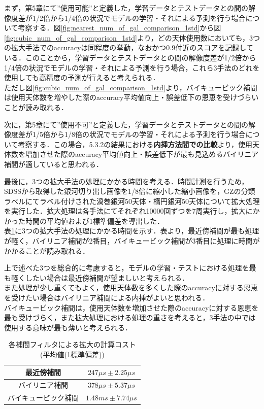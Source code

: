 \documentclass[a4j, 11pt]{jreport}
\begin{document}
まず，第5章にて''使用可能''と定義した，学習データとテストデータとの間の解像度差が1/2倍から1/4倍の状況でモデルの学習・それによる予測を行う場合について考察する．図\ref{fig:nearest_num_of_gal_comparison_1std}から図\ref{fig:cubic_num_of_gal_comparison_1std}より，どの天体使用数においても，3つの拡大手法でのaccuracyは同程度の挙動，なおかつ0.9付近のスコアを記録している．このことから，学習データとテストデータとの間の解像度差が1/2倍から1/4倍の状況でモデルの学習・それによる予測を行う場合，これら3手法のどれを使用しても高精度の予測が行えると考えられる．
\\ただし図\ref{fig:cubic_num_of_gal_comparison_1std}より，バイキュービック補間は使用天体数を増やした際のaccuracy平均値向上・誤差低下の恩恵を受けづらいことが読み取れる．

次に，第5章にて''使用不可''と定義した，学習データとテストデータとの間の解像度差が1/5倍から1/8倍の状況でモデルの学習・それによる予測を行う場合について考察する．この場合，5.3.2の結果における\textbf{内挿方法間での比較}より，使用天体数を増加させた際のaccuracy平均値向上・誤差低下が最も見込めるバイリニア補間が適していると思われる．

最後に，3つの拡大手法の処理にかかる時間を考える．時間計測を行うため，SDSSから取得した銀河切り出し画像を1/8倍に縮小した縮小画像を，GZの分類ラベルにてラベル付けされた渦巻銀河50天体・楕円銀河50天体について拡大処理を実行した．拡大処理は各手法にてそれぞれ10000回ずつを7周実行し，拡大にかかった時間の平均値および1標準偏差を導出した．
\\表\ref{tb:calc_cost_by_interpolation}に3つの拡大手法の処理にかかる時間を示す．表より，最近傍補間が最も処理が軽く，バイリニア補間が2番目，バイキュービック補間が3番目に処理に時間がかかることが読み取れる．

上で述べた3つを総合的に考慮すると，モデルの学習・テストにおける処理を最も軽くしたい場合は最近傍補間が望ましいと考えられる．
\\また処理が少し重くてもよく，使用天体数を多くした際のaccuracyに対する恩恵を受けたい場合はバイリニア補間による内挿がよいと思われる．
\\バイキュービック補間は，使用天体数を増加させた際のaccuracyに対する恩恵を最も受けづらく，また拡大処理における処理の重さを考えると，3手法の中では使用する意味が最も薄いと考えられる．

\begin{table}[htbp]
  \centering
	\caption{各補間フィルタによる拡大の計算コスト(平均値(1標準偏差))}
  \begin{tabular}{|c|c|}
		\hline
    最近傍補間 & $247\mu s \pm 2.25\mu s$ \\ \hline
    バイリニア補間 & $378\mu s \pm 5.37\mu s$ \\ \hline
    バイキュービック補間 & $1.48ms \pm 7.74\mu s$ \\ \hline
  \end{tabular}
  \label{tb:calc_cost_by_interpolation}
\end{table}
\end{document}
